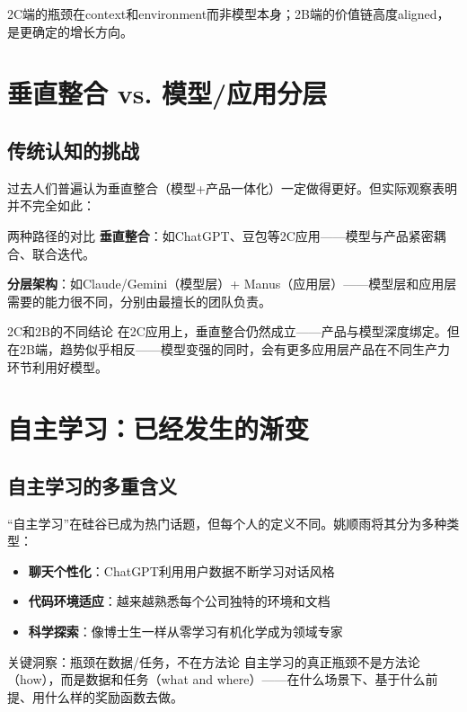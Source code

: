 \documentclass[a4paper]{article}
\begin{document}
2C端的瓶颈在context和environment而非模型本身；2B端的价值链高度aligned，是更确定的增长方向。


\section{垂直整合 vs. 模型/应用分层}

\subsection{传统认知的挑战}

过去人们普遍认为垂直整合（模型+产品一体化）一定做得更好。但实际观察表明并不完全如此：

\begin{knowledgebox}{两种路径的对比}
\textbf{垂直整合}：如ChatGPT、豆包等2C应用——模型与产品紧密耦合、联合迭代。

\textbf{分层架构}：如Claude/Gemini（模型层）+ Manus（应用层）——模型层和应用层需要的能力很不同，分别由最擅长的团队负责。
\end{knowledgebox}

\begin{warningbox}{2C和2B的不同结论}
在2C应用上，垂直整合仍然成立——产品与模型深度绑定。但在2B端，趋势似乎相反——模型变强的同时，会有更多应用层产品在不同生产力环节利用好模型。
\end{warningbox}


\section{自主学习：已经发生的渐变}

\subsection{自主学习的多重含义}

``自主学习''在硅谷已成为热门话题，但每个人的定义不同。姚顺雨将其分为多种类型：

\begin{itemize}
\item \textbf{聊天个性化}：ChatGPT利用用户数据不断学习对话风格
\item \textbf{代码环境适应}：越来越熟悉每个公司独特的环境和文档
\item \textbf{科学探索}：像博士生一样从零学习有机化学成为领域专家
\end{itemize}

\begin{importantbox}{关键洞察：瓶颈在数据/任务，不在方法论}
自主学习的真正瓶颈不是方法论（how），而是数据和任务（what and where）——在什么场景下、基于什么前提、用什么样的奖励函数去做。
\end{importantbox}
\end{document}
